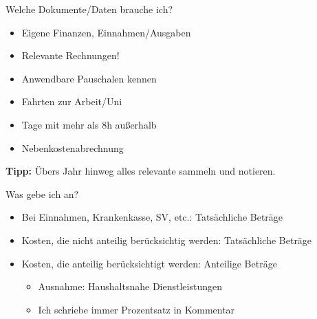 \documentclass{beamer}
\begin{document}
			\begin{frame}{Welche Dokumente/Daten brauche ich?}
				\begin{itemize}
					\item Eigene Finanzen, Einnahmen/Ausgaben
					\item Relevante Rechnungen!
					\item Anwendbare Pauschalen kennen
					\item Fahrten zur Arbeit/Uni
					\item Tage mit mehr als 8h außerhalb
					\item Nebenkostenabrechnung
				\end{itemize}\n
				\textbf{Tipp:} Übers Jahr hinweg alles relevante sammeln und notieren.
			\end{frame}
				
			\begin{frame}{Was gebe ich an?}
				\begin{itemize}
					\item Bei Einnahmen, Krankenkasse, SV, etc.: Tatsächliche Beträge
					\item Kosten, die nicht anteilig berücksichtig werden: Tatsächliche Beträge
					\item Kosten, die anteilig berücksichtigt werden: Anteilige Beträge
					\begin{itemize}
						\item Ausnahme: Haushaltsnahe Dienstleistungen
						\item Ich schriebe immer Prozentsatz in Kommentar
					\end{itemize}
				\end{itemize}
			\end{frame}
			
			
\end{document}
